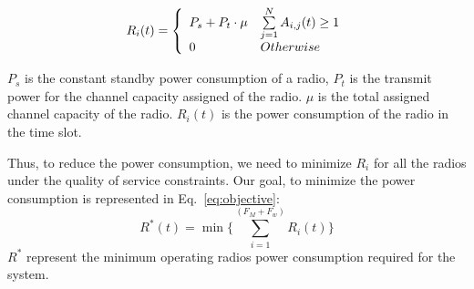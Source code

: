 \begin{equation}
\label{eq:radio}
 R_i(t) = \left\{ 
	  \begin{array}{l l}
	    P_s+P_t\cdot\mu   &  \sum\limits_{j=1}^N A_{i,j}(t) \ge 1\\
		0 &  Otherwise
			    \end{array} \right.
\end{equation}

$P_s$ is the constant standby power consumption of a radio, $P_t$ is the transmit power for the channel capacity 
assigned of the radio. $\mu$ is the total assigned channel capacity of the radio.
$R_i(t)$ is the power consumption of the radio in the time slot.

Thus, to reduce the power consumption, we need to minimize $R_i$ for all the radios under the quality of service 
constraints. 
Our goal, to minimize the power consumption is represented in Eq.~\ref{eq:objective}:
\begin{equation}
\label{eq:objective}
R^*(t) = \min{\{\sum\limits_{i=1}^{(F_M+F_w)} R_{i}}(t)\}
\end{equation}
$R^*$ represent the minimum operating radios power consumption required for the system. 

